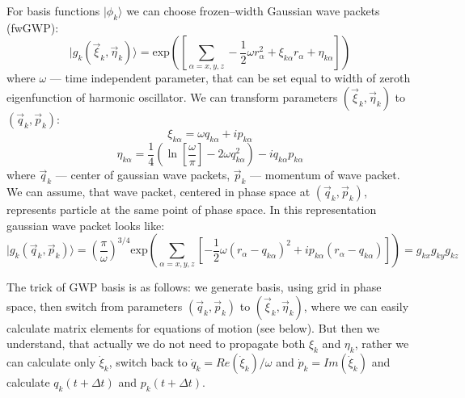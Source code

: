 For basis functions $|\phi_k\rangle$ we can choose frozen--width Gaussian wave packets (fwGWP):
$$|g_k(\vec{\xi}_k,\vec{\eta}_k)\rangle=\text{exp}\left(\left[\sum_{\alpha=x,y,z}-\frac{1}{2}\omega r_{\alpha}^2+\xi_{k\alpha}r_{\alpha}+\eta_{k\alpha}\right]\right)$$
where $\omega$ --- time independent parameter, that can be set equal to width of zeroth eigenfunction of harmonic oscillator.
We can transform parameters $(\vec{\xi}_k,\vec{\eta}_k)$ to $(\vec{q}_k,\vec{p}_k)$: 
$$\xi_{k\alpha} = \omega q_{k\alpha}+i p_{k\alpha}$$
$$\eta_{k\alpha} = \frac{1}{4}\left(\ln\left[{\frac{\omega}{\pi}}\right]-2\omega q_{k\alpha}^2\right)-iq_{k\alpha}p_{k\alpha}$$
where $\vec{q}_k$ --- center of gaussian wave packets, $\vec{p}_k$ --- momentum of wave packet. 
We can assume, that wave packet, centered in phase space at $(\vec{q}_k,\vec{p}_k)$, represents particle at the same point of phase space.
In this representation gaussian wave packet looks like:
$$|g_k(\vec{q}_{k},\vec{p}_{k})\rangle = \left(\frac{\pi}{\omega}\right)^{3/4} \text{exp}\left(\sum_{\alpha=x,y,z}\left[-\frac{1}{2}\omega(r_{\alpha}-q_{k\alpha})^2+%
									 ip_{k\alpha}(r_{\alpha}-q_{k\alpha})\right]\right)=g_{kx}g_{ky}g_{kz}$$

The trick of GWP basis is as follows: we generate basis, using grid in phase space, 
then switch from parameters $(\vec{q}_k,\vec{p}_k)$ to $(\vec{\xi}_k,\vec{\eta}_k)$, 
where we can easily calculate matrix elements for equations of motion (see below).
But then we understand, that actually we do not need to propagate both $\xi_k$ and $\eta_k$,
rather we can calculate only $\dot{\xi}_k$, switch back to $\dot{q}_k=\mathit{Re}(\dot{\xi}_k)/\omega$ 
and $\dot{p}_k=\mathit{Im}(\dot{\xi}_k)$ and calculate $q_k(t+\Delta t)$ and $p_k(t+\Delta t)$.


